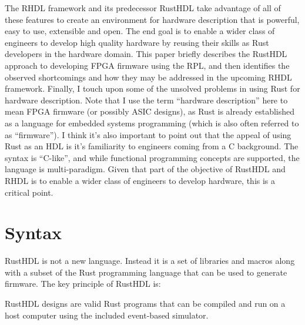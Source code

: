 \documentclass[sigplan,screen,sigconf]{acmart}
\begin{document}
The RHDL framework and its predecessor RustHDL take advantage of all of these features to
create an environment for hardware description that is powerful, easy to use, extensible and open.  The end goal is to enable a wider class of engineers to develop high quality hardware by reusing their skills as Rust developers in the hardware domain.  This paper briefly describes the RustHDL approach to developing FPGA firmware using the RPL, and then identifies the observed shortcomings and how they may be addressed in the upcoming RHDL framework.  Finally, I touch upon some of the unsolved problems in using Rust for hardware description.  Note that I use the term ``hardware description'' here to mean FPGA firmware (or possibly ASIC designs), as Rust is already established as a language for embedded systems programming (which is also often referred to as ``firmware''). 
I think it's also important to point out that the appeal of using Rust as an HDL is it's familiarity to engineers coming from a C background.  The syntax is ``C-like'', and
while functional programming concepts are supported, the language is multi-paradigm.  Given that part of the objective of RustHDL and RHDL is to enable a wider class of engineers to develop hardware, this is a critical point.

\section{Syntax}
RustHDL is not a new language.  Instead it is a set of libraries and macros along with a 
subset of the Rust programming language that can be used to generate firmware.  The key
principle of RustHDL is:

\begin{tcolorbox}
RustHDL designs are valid Rust programs that can be compiled and run on a host computer
using the included event-based simulator.
\end{tcolorbox}
\end{document}

